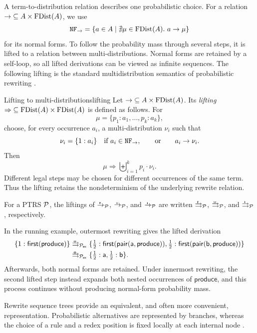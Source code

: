 A term-to-distribution relation describes one probabilistic choice.  For a
relation $\to\;\subseteq A\times\FDist(A)$, we use
\[
  \NF_{\to}=\{a\in A\mid \nexists\mu\in\FDist(A).\ a\to\mu\}
\]
for its normal forms.  To follow
the probability mass through several steps, it is lifted to a relation between
multi-distributions.  Normal forms are retained by a self-loop, so all lifted
derivations can be viewed as infinite sequences.  The following lifting is the
standard multidistribution semantics of probabilistic rewriting
\cite{avanzini_dallago_yamada_2020,kassing_giesl_2025}.

\begin{Definition}{Lifting to multi-distributions}{lifting}
  Let $\to\;\subseteq A\times\FDist(A)$.  Its \emph{lifting}
  $\Rightarrow\;\subseteq\FDist(A)\times\FDist(A)$ is defined as follows.
  For
  \[
    \mu=\{p_1:a_1,\ldots,p_k:a_k\},
  \]
  choose, for every occurrence $a_i$, a multi-distribution $\nu_i$ such that
  \[
    \nu_i=\{1:a_i\}\quad\text{if }a_i\in\NF_{\to},
    \qquad\text{or}\qquad
    a_i\to\nu_i.
  \]
  Then
  \[
    \mu\Rightarrow\biguplus_{i=1}^k p_i\cdot\nu_i.
  \]
  Different legal steps may be chosen for different occurrences of the same
  term.  Thus the lifting retains the nondeterminism of the underlying rewrite
  relation.
\end{Definition}

For a PTRS $\P$, the liftings of $\fto_\P$, $\oto_\P$, and $\ito_\P$ are
written $\fliftto_\P$, $\oliftto_\P$, and $\iliftto_\P$, respectively.

In the running example, outermost rewriting gives the lifted derivation
\[
  \begin{aligned}
    \{1:\mathsf{first}(\mathsf{produce})\}
    &\oliftto_{\P_{\mathsf{ex}}}
      \{\tfrac12:\mathsf{first}(\mathsf{pair}(\mathsf a,\mathsf{produce})),
        \tfrac12:\mathsf{first}(\mathsf{pair}(\mathsf b,\mathsf{produce}))\}
      \\
    &\oliftto_{\P_{\mathsf{ex}}}
      \{\tfrac12:\mathsf a,\tfrac12:\mathsf b\}.
  \end{aligned}
\]
Afterwards, both normal forms are retained.  Under innermost rewriting, the
second lifted step instead expands both nested occurrences of
$\mathsf{produce}$, and this process continues without producing normal-form
probability mass.

Rewrite sequence trees provide an equivalent, and often more convenient,
representation.  Probabilistic alternatives are represented by branches,
whereas the choice of a rule and a redex position is fixed locally at each
internal node \cite{kassing_giesl_2025}.


